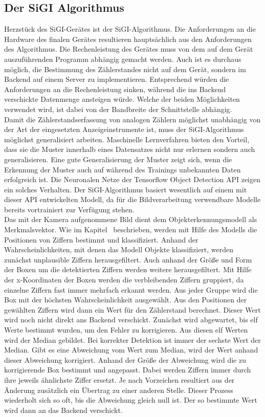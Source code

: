 \subsection{Der SiGI Algorithmus}
    Herzstück des SiGI-Gerätes ist der SiGI-Algorithmus. Die Anforderungen an die Hardware des finalen Gerätes resultieren hauptsächlich aus den Anforderungen des Algorithmus. Die Rechenleistung des Gerätes muss von dem auf dem Gerät auszuführenden Programm abhängig gemacht werden. Auch ist es durchaus möglich, die Bestimmung des Zählerstandes nicht auf dem Gerät, sondern im Backend auf einem Server zu implementieren. Entsprechend würden die Anforderungen an die Rechenleistung sinken, während die ins Backend verschickte Datenmenge ansteigen würde. Welche der beiden Möglichkeiten verwendet wird, ist dabei von der Bandbreite der Schnittstelle abhängig.\\ Damit die Zählerstandserfassung von analogen Zählern möglichst unabhängig von der Art der eingesetzten Anzeigeinstrumente ist, muss der SiGI-Algorithmus möglichst generalisiert arbeiten. Maschinelle Lernverfahren bieten den Vorteil, dass sie die Muster innerhalb eines Datensatzes nicht nur erlernen sondern auch generalisieren\cite{Süße2014-2}. Eine gute Generalisierung der Muster zeigt sich, wenn die Erkennung der Muster auch auf während des Trainings unbekannten Daten erfolgreich ist. Die Neuronalen Netze der Tensorflow Object Detection API zeigen ein solches Verhalten. Der SiGI-Algorithmus basiert wesentlich auf einem mit dieser API entwickelten Modell, da für die Bildverarbeitung verwendbare Modelle bereits vortrainiert zur Verfügung stehen.\\ Das mit der Kamera aufgenommene Bild dient dem Objekterkennungsmodell als Merkmalsvektor. Wie im Kapitel~ beschrieben, werden mit Hilfe des Modells die Positionen von Ziffern bestimmt und klassifiziert. Anhand der Wahrscheinlichkeiten, mit denen das Modell Objekte klassifiziert, werden zunächst unplausible Ziffern herausgefiltert. Auch anhand der Größe und Form der Boxen um die detektierten Ziffern werden weitere herausgefiltert. Mit Hilfe der x-Koordinaten der Boxen werden die verbleibenden Ziffern gruppiert, da einzelne Ziffern fast immer mehrfach erkannt werden. Aus jeder Gruppe wird die Box mit der höchsten Wahrscheinlichkeit ausgewählt. Aus den Positionen der gewählten Ziffern wird dann ein Wert für den Zählerstand berechnet. Dieser Wert wird noch nicht direkt ans Backend verschickt. Zunächst wird abgewartet, bis elf Werte bestimmt wurden, um den Fehler zu korrigieren. Aus diesen elf Werten wird der Median gebildet. Bei korrekter Detektion ist immer der sechste Wert der Median. Gibt es eine Abweichung vom Wert zum Median, wird der Wert anhand dieser Abweichung korrigiert. Anhand der Größe der Abweichung wird die zu korrigierende Box bestimmt und angepasst. Dabei werden Ziffern  immer durch ihre jeweils ähnlichste Ziffer ersetzt. Je nach Vorzeichen resultiert aus der Änderung zusätzlich ein Übertrag zu einer anderen Stelle. Dieser Prozess wiederholt sich so oft, bis die Abweichung gleich null ist. Der so bestimmte Wert wird dann an das Backend verschickt.